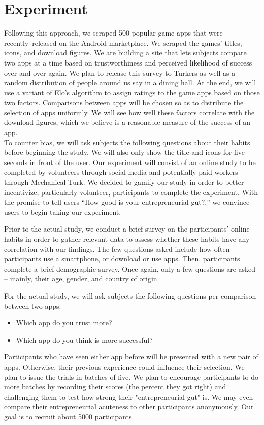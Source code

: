 \section{Experiment}


Following this approach, we scraped 500 popular game apps that were recently released on the Android marketplace. We scraped the games' titles, icons, and download figures. We are building a site that lets subjects compare two apps at a time based on trustworthiness and perceived likelihood of success over and over again. We plan to release this survey to Turkers as well as a random distribution of people around us say in a dining hall. At the end, we will use a variant of Elo's algorithm to assign ratings to the game apps based on those two factors. Comparisons between apps will be chosen so as to distribute the selection of apps uniformly. We will see how well these factors correlate with the download figures, which we believe is a reasonable measure of the success of an app. \\

To counter bias, we will ask subjects the following questions about their habits before beginning the study. We will also only show the title and icons for five seconds in front of the user. Our experiment will consist of an online study to be completed by volunteers through social media and potentially paid workers through Mechanical Turk. We decided to gamify our study in order to better incentivize, particularly volunteer, participants to complete the experiment. With the promise to tell users “How good is your entrepreneurial gut?,” we convince users to begin taking our experiment.

Prior to the actual study, we conduct a brief survey on the participants' online habits in order to gather relevant data to assess whether these habits have any correlation with our findings. The few questions asked include how often participants use a smartphone, or download or use apps. Then, participants complete a brief demographic survey. Once again, only a few questions are asked -- mainly, their age, gender, and country of origin.

For the actual study, we will ask subjects the following questions per comparison between two apps.

\begin{itemize}
\item Which app do you trust more?
\item Which app do you think is more successful?
\end{itemize}

Participants who have seen either app before will be presented with a new pair of apps. Otherwise, their previous experience could influence their selection. We plan to issue the trials in batches of five. We plan to encourage participants to do more batches by recording their scores (the percent they got right) and challenging them to test how strong their "entrepreneurial gut" is. We may even compare their entrepreneurial acuteness to other participants anonymously. Our goal is to recruit about 5000 participants.

